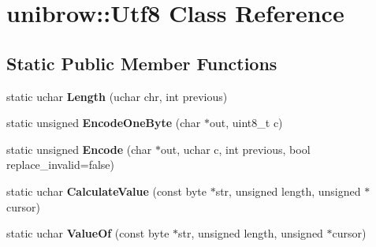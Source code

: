 \hypertarget{classunibrow_1_1_utf8}{}\section{unibrow\+:\+:Utf8 Class Reference}
\label{classunibrow_1_1_utf8}
\subsection*{Static Public Member Functions}
\begin{DoxyCompactItemize}
\item 
\hypertarget{classunibrow_1_1_utf8_a5c6a30a8610649fee6dbb05057862113}{}static uchar {\bfseries Length} (uchar chr, int previous)\label{classunibrow_1_1_utf8_a5c6a30a8610649fee6dbb05057862113}

\item 
\hypertarget{classunibrow_1_1_utf8_a944c72d1ddbcccc8f6386f1ff971404f}{}static unsigned {\bfseries Encode\+One\+Byte} (char $\ast$out, uint8\+\_\+t c)\label{classunibrow_1_1_utf8_a944c72d1ddbcccc8f6386f1ff971404f}

\item 
\hypertarget{classunibrow_1_1_utf8_acf0af099acd418650bf1a8080f14e926}{}static unsigned {\bfseries Encode} (char $\ast$out, uchar c, int previous, bool replace\+\_\+invalid=false)\label{classunibrow_1_1_utf8_acf0af099acd418650bf1a8080f14e926}

\item 
\hypertarget{classunibrow_1_1_utf8_afbe2fb222a6f108282038b2ee4b42968}{}static uchar {\bfseries Calculate\+Value} (const byte $\ast$str, unsigned length, unsigned $\ast$cursor)\label{classunibrow_1_1_utf8_afbe2fb222a6f108282038b2ee4b42968}

\item 
\hypertarget{classunibrow_1_1_utf8_a3feedb68acf28dc3c0e8b88d0916fb62}{}static uchar {\bfseries Value\+Of} (const byte $\ast$str, unsigned length, unsigned $\ast$cursor)\label{classunibrow_1_1_utf8_a3feedb68acf28dc3c0e8b88d0916fb62}

\end{DoxyCompactItemize}
